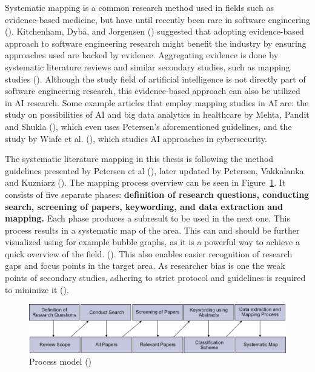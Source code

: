 \documentclass[utf8,english]{gradu3}
\begin{document}
Systematic mapping is a common research method used in fields such as
evidence-based medicine, but have until recently been rare in software
engineering (\cite{petersen2008}). Kitchenham, Dybå, and Jorgensen
(\cite*{kitchenham2004}) suggested that adopting evidence-based approach to
software engineering research might benefit the industry by ensuring approaches
used are backed by evidence. Aggregating evidence is done by systematic
literature reviews and similar secondary studies, such as mapping studies
(\cite{kitchenham2010}). Although the study field of artificial intelligence is
not directly part of software engineering research, this evidence-based approach
can also be utilized in AI research. Some example articles that employ mapping
studies in AI are: the study on possibilities of AI and big data analytics in
healthcare by Mehta, Pandit and Shukla (\cite*{mehta2019aimapping}), which even
uses Petersen's aforementioned guidelines, and the study by Wiafe et al.
(\cite*{wiafe2020aimapping}), which studies AI approaches in cybersecurity.


The systematic literature mapping in this thesis is following the method
guidelines presented by Petersen et al (\cite*{petersen2008}), later updated by
Petersen, Vakkalanka and Kuzniarz (\cite*{petersen2015}). The mapping process
overview can be seen in Figure~\ref{fig:mapping}. It consists of five separate
phases: \textbf{definition of research questions, conducting search, screening
of papers, keywording, and data extraction and mapping.} Each phase produces a
subresult to be used in the next one. This process results in a systematic map
of the area. This can and should be further visualized using for example bubble
graphs, as it is a powerful way to achieve a quick overview of the field.
(\cite{petersen2008}). This also enables easier recognition of research gaps and
focus points in the target area. As researcher bias is one the weak points of
secondary studies, adhering to strict protocol and guidelines is required to
minimize it (\cite{brereton2007}).


\begin{figure}[H]
  \includegraphics[width=\linewidth]{images/petersen_model.png}
  \caption{Process model (\cite{petersen2008})}
  \label{fig:mapping}
\end{figure}
\end{document}
